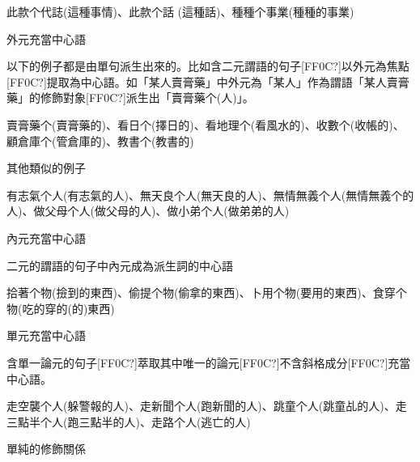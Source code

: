 \textrm{此款个代誌(這種事情)}、\textrm{此款个話 (這種話)}、\textrm{種種个事業(種種的事業)}

\begin{listWWviiiNumxivleveli}
\item \begin{styleqwerty}\rmfamily
外元充當中心語
\end{styleqwerty}
\end{listWWviiiNumxivleveli}

\textrm{以下的例子都是由單句派生出來的。比如含二元謂語的句子[FF0C?]以外元為焦點[FF0C?]提取為中心語。如「某人賣膏藥」中外元為「某人」作為謂語「某人賣膏藥」的修飾對象[FF0C?]派生出「賣膏藥个(人)」}。

\textrm{賣膏藥个(賣膏藥的)}、\textrm{看日个(擇日的)}、\textrm{看地理个(看風水的)}、\textrm{收數个(收帳的)}、\textrm{顧倉庫个(管倉庫的)}、\textrm{教書个(教書的)}

\rmfamily
其他類似的例子

\textrm{有志氣个人(有志氣的人)}、\textrm{無天良个人(無天良的人)}、\textrm{無情無義个人(無情無義个的人)}、\textrm{做父母个人(做父母的人)}、\textrm{做小弟个人(做弟弟的人)}

\begin{listWWviiiNumxivleveli}
\item \begin{styleqwerty}\rmfamily
內元充當中心語
\end{styleqwerty}
\end{listWWviiiNumxivleveli}
\rmfamily
二元的謂語的句子中內元成為派生詞的中心語

\textrm{拾著个物(撿到的東西)}、\textrm{偷提个物(偷拿的東西)}、\textrm{卜用个物(要用的東西)}、\textrm{食穿个物(吃的穿的(的)東西)}

\begin{listWWviiiNumxivleveli}
\item \begin{styleqwerty}\rmfamily
單元充當中心語
\end{styleqwerty}
\end{listWWviiiNumxivleveli}

\textrm{含單一論元的句子[FF0C?]萃取其中唯一的論元[FF0C?]不含斜格成分[FF0C?]充當中心語。}

\textrm{走空襲个人(躲警報的人)}、\textrm{走新聞个人(跑新聞的人)}、\textrm{跳童个人(跳童乩的人)}、\textrm{走三點半个人(跑三點半的人)}、\textrm{走路个人(逃亡的人)}

\begin{listWWviiiNumxivleveli}
\item \begin{styleqwerty}\rmfamily
單純的修飾關係
\end{styleqwerty}
\end{listWWviiiNumxivleveli}

